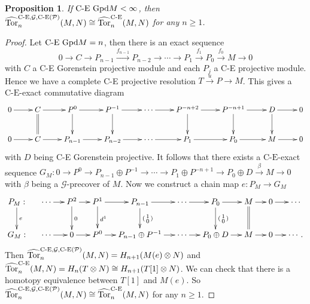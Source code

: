 \documentclass[reqno,12pt]{amsart}
\numberwithin{equation}{section}
\theoremstyle{plain}
\newtheorem{proposition}[theorem]{\bf Proposition}
\theoremstyle{definition}
\newcommand{\CE}{\mathrm{C}\text{-}\mathrm{E}}
\begin{document}
\begin{proposition}\label{prop-8}
    If $\text{\rm C-E Gpd}M<\infty$, then $\widehat{\Tor}_n^{\CE,\mathcal{G},\CE(\mathcal{P})}(M,N)\cong \widehat{\Tor}_n^{\CE}(M,N)$ for any $n\geq 1$.
\end{proposition}
\begin{proof}
    Let $\text{\rm C-E Gpd}M=n$, then there is an exact sequence $$0\to C\to P_{n-1}\stackrel{f_{n-1}}\to P_{n-2}\to \cdots \to P_{1}\stackrel{f_{1}}\to P_0\stackrel{f_{0}}\to M\to 0$$ with $C$ a C-E Gorenstein projective module and each $P_j$ a C-E projective module. Hence we have a complete C-E projective resolution $T\stackrel{u}\to P\to M$. This gives a $\CE$-exact commutative diagram $$\xymatrix{
        0\ar[r] & C \ar[r] \ar@{=}[d] & P^0 \ar[r] \ar[d] & P^{-1} \ar[r] \ar[d] & \cdots \ar[r] & P^{-n+2} \ar[r] \ar[d] & P^{-n+1} \ar[r] \ar[d] & D \ar[d] \ar[r] & 0\\
        0\ar[r] & C \ar[r] & P_{n-1} \ar[r] & P_{n-2} \ar[r] & \cdots \ar[r] & P_{1} \ar[r] & P_{0} \ar[r] & M \ar[r] & 0\\
    }$$
with $D$ being C-E Gorenstein projective. It follows that there exists a $\CE$-exact sequence $G_M: 0\to P^0\to P_{n-1}\oplus P^{-1}\to \cdots \to P_{1}\oplus P^{-n+1}\to P_0\oplus D \stackrel{\beta}\to M \to 0$ with $\beta$ being a $\mathcal{G}$-precover of $M$. Now we construct a chain map $e:P_M\to G_M$  $$\xymatrix@C=1.3em{
    P_M:\ar[d]^{e} & \cdots\ar[r] & P^{2}\ar[d]^{0} \ar[r] & P^{1} \ar[r] \ar[d]^{d^{1}}& P_{n-1} \ar[r]\ar[d]^{(\smqty{1\\0})} & \cdots\ar[r] & P_0  \ar[r]\ar[d]^{(\smqty{1\\0})} & M \ar[r]\ar@{=}[d] & 0 \ar[r] & \cdots\\
    G_M: & \cdots\ar[r] & 0 \ar[r] & P^{0} \ar[r] & P_{n-1}\oplus P^{-1} \ar[r] & \cdots\ar[r] & P_0\oplus D \ar[r] & M \ar[r] & 0 \ar[r] & \cdots.
}$$ Then $\widehat{\mbox{\rm Tor}}_n^{\text{C-E},\mathcal{G},\text{C-E}(\mathcal{P})}(M,N)=H_{n+1}(M(e)\otimes N)$ and $\widehat{\mbox{\rm Tor}}_n^{\text{C-E}}(M,N)=H_n(T\otimes N)\cong H_{n+1}(T[1]\otimes N)$. We can check that there is a homotopy equivalence between $T[1]$ and $M(e)$. So $\widehat{\mbox{\rm Tor}}_n^{\text{C-E},\mathcal{G},\text{C-E}(\mathcal{P})}(M,N)\cong \widehat{\mbox{\rm Tor}}_n^{\text{C-E}}(M,N)$ for any $n\geq 1$.
\end{proof}
\end{document}
